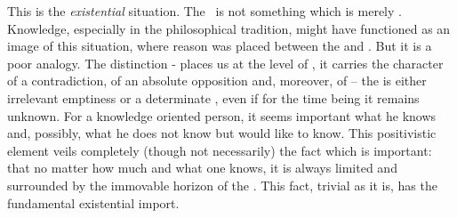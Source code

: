 This is the {\em existential} situation.  The \HH\ is not something which is
merely .  Knowledge, especially in the philosophical tradition,
might have functioned as an image of this situation, where reason was placed
between the  and .  But it is a poor analogy.
The distinction - places us at the level of
, it carries the character of a contradiction, of an absolute
opposition and, moreover, of  -- the  is
either irrelevant emptiness or a determinate , even if for the
time being it remains unknown. 
%
For a knowledge oriented person, it seems important what he knows and, possibly,
what he does not know but would like to know. This positivistic element veils
completely (though not necessarily) the fact which is important: that no matter
how much and what one knows, it is always limited and surrounded by the
immovable horizon of the . This fact, trivial as it is, has the
fundamental existential import.

